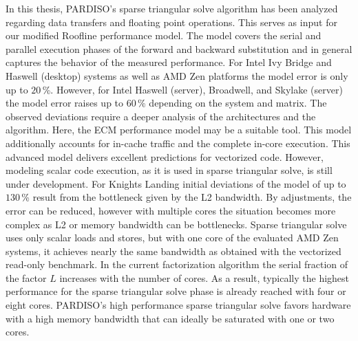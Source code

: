 In this thesis, PARDISO's sparse triangular solve algorithm has been analyzed regarding data transfers and floating point operations. This serves as input for our modified Roofline performance model. The model covers the serial and parallel execution phases of the forward and backward substitution and in general captures the behavior of the measured
performance. For Intel Ivy Bridge and Haswell (desktop) systems as well as AMD Zen platforms the model error is only up to $20$\,\%. However, for Intel Haswell (server), Broadwell, and Skylake (server) the model error raises up to $60$\,\% depending on the system and matrix. The observed deviations require a deeper analysis
of the architectures and the algorithm. Here, the ECM performance
model may be a suitable tool. This model additionally accounts for in-cache traffic and the complete in-core execution. This advanced model delivers excellent predictions for vectorized code. However, modeling scalar code execution, as it is used in sparse triangular solve, is still under development. For Knights Landing initial deviations of the model
of up to $130$\,\% result from the bottleneck given by the L2 bandwidth.
By adjustments, the error can be reduced, however with multiple cores the situation becomes more complex as L2 or memory bandwidth can be bottlenecks. Sparse triangular solve uses only scalar loads and stores, but with one core of the evaluated AMD Zen systems, it achieves nearly the same bandwidth as obtained with the vectorized read-only benchmark. In the current factorization algorithm the serial fraction of the factor $L$
increases with the number of cores. As a result, typically the highest performance for the sparse triangular solve phase is already reached with four or eight cores.
PARDISO's high performance sparse triangular solve favors hardware with a high
memory bandwidth that can ideally be saturated with one or two cores.
